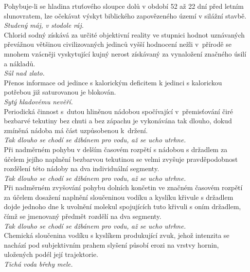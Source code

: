 \begin{multicols}{\value{columnsgames}}
\noindent
Pohybuje-li se hladina rtuťového sloupce dolů v období 52 až 22
dní před letním slunovratem, lze očekávat výskyt biblického zapovězeného
území v silážní stavbě.\\[1 mm]
{\sl Studený máj, v stodole ráj.}\\

\noindent
Chlorid sodný získává za určité objektivní reality ve stupnici
hodnot uznávaných převážnou většinou civilizovaných jedinců vyšší
hodnocení nežli v~přírodě se mnohem vzácněji vyskytující
kujný nerost získávaný za vynaložení značného úsilí a nákladů.\\[1 mm]
{\sl Sůl nad zlato.}\\

\noindent
Přenos informace od jedince s kalorickým deficitem k jedinci
s kalorickou potřebou již saturovanou je blokován.\\[1 mm]
{\sl Sytý hladovému nevěří.}\\

\noindent
Periodická činnost s~dutou hliněnou nádobou spočívající
v~přemisťování čiré bezbarvé tekutiny bez chuti a bez
zápachu je vykonávána tak dlouho, dokud zmíněná nádoba má část
uzpůsobenou k~držení.\\[1 mm]
{\sl Tak dlouho se chodí se džbánem pro vodu, až se ucho utrhne.}\\

\noindent
Při nadměrném pohybu v delším časovém rozpětí s nádobou s držadlem
za účelem jejího naplnění bezbarvou tekutinou se velmi zvyšuje
pravděpodobnost rozdělení této nádoby na dva individuální segmenty.\\[1 mm]
{\sl Tak dlouho se chodí se džbánem pro vodu, až se ucho utrhne.}\\

\noindent
Při nadměrném zvyšování pohybu dolních končetin ve značném
časovém rozpětí za účelem dosažení naplnění sloučeninou vodíku
a kyslíku křivule s držadlem dojde jednoho dne k uvolnění molekul
spojujících tuto křivuli s oním držadlem, čímž se jmenovaný předmět
rozdělí na dva segmenty.\\[1 mm]
{\sl Tak dlouho se chodí se džbánem pro vodu, až se ucho utrhne.}\\

\noindent
Chemická sloučenina vodíku s kyslíkem produkující zvuk, jehož
intenzita se nachází pod subjektivním prahem slyšení působí erozi
na vrstvy hornin, uložených podél její trajektorie.\\[1 mm]
{\sl Tichá voda břehy mele.}\\


\end{multicols}
